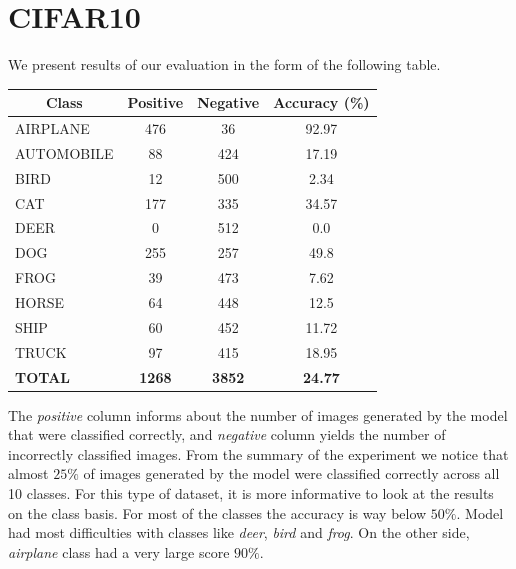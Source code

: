 \documentclass[12pt,a4paper,openany]{book}
\begin{document}
\section{CIFAR10}
\noindent We present results of our evaluation in the form of the following table. \\
\begin{table}[h!]
\centering
\begin{tabular}{|l|c|c|c|}
\hline
\multicolumn{1}{|c|}{\textbf{Class}} & \textbf{Positive} & \textbf{Negative} & \textbf{Accuracy (\%)}       \\ \hline
AIRPLANE                             & 476               & 36                & {\color[HTML]{32CB00} 92.97} \\ \hline
AUTOMOBILE                           & 88                & 424               & 17.19                        \\ \hline
BIRD                                 & 12                & 500               & 2.34                         \\ \hline
CAT                                  & 177               & 335               & 34.57                        \\ \hline
DEER                                 & 0                 & 512               & {\color[HTML]{FE0000} 0.0}   \\ \hline
DOG                                  & 255               & 257               & 49.8                         \\ \hline
FROG                                 & 39                & 473               & 7.62                         \\ \hline
HORSE                                & 64                & 448               & 12.5                         \\ \hline
SHIP                                 & 60                & 452               & 11.72                        \\ \hline
TRUCK                                & 97                & 415               & 18.95                        \\ \hline
\textbf{TOTAL}                       & \textbf{1268}     & \textbf{3852}     & \textbf{24.77}               \\ \hline
\end{tabular}
\end{table}
\newline
\noindent The \textit{positive} column informs about the number of images generated by the model that were classified correctly, and \textit{negative} column yields the number of incorrectly classified images. From the summary of the experiment we notice that almost $25\%$ of images generated by the model were classified correctly across all 10 classes. For this type of dataset, it is more informative to look at the results on the class basis.
\noindent For most of the classes the accuracy is way below $50\%$. Model had most difficulties with classes like \textit{deer}, \textit{bird} and \textit{frog}. On the other side, \textit{airplane} class had a very large score $90\%$.\\
\end{document}

